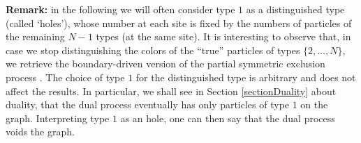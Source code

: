 \documentclass[11pt]{article}
\numberwithin{equation}{section}
\numberwithin{equation}{subsection}
\begin{document}
\vspace{.5cm}
\noindent
{\bf Remark:} in the following we will often consider type $1$ as a distinguished type
(called `holes'), whose number at each site is fixed by the numbers of particles 
of the remaining $N-1$ types (at the same site). It is interesting to observe that, in case we stop distinguishing the colors of the ``true'' particles of types $\{2,\ldots,N\}$, we retrieve the 
boundary-driven version of the partial symmetric exclusion process \cite{schutzSandow,carinci2013duality}.
The choice of type $1$ for the distinguished type is arbitrary and does not affect
the results. In particular, we shall see in Section \ref{sectionDuality} about duality, that
the dual process eventually has only particles of type $1$ on the graph.
Interpreting type $1$ as an hole, one can then say that the dual process voids the graph.  
\end{document}
